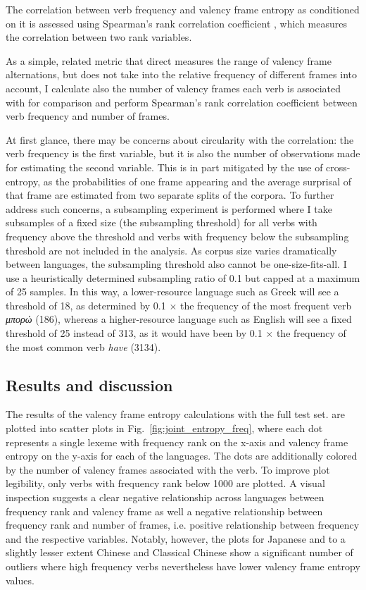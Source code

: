The correlation between verb frequency and valency frame entropy as conditioned on it is assessed using Spearman's rank correlation coefficient \citep{spearman1904}, which measures the correlation between two rank variables. 

As a simple, related metric that direct measures the range of valency frame alternations, but does not take into the relative frequency of different frames into account, I calculate also the number of valency frames each verb is associated with for comparison and perform Spearman's rank correlation coefficient between verb frequency and number of frames.

At first glance, there may be concerns about circularity with the correlation: the verb frequency is the first variable, but it is also the number of observations made for estimating the second variable. This is in part mitigated by the use of cross-entropy, as the probabilities of one frame appearing and the average surprisal of that frame are estimated from two separate splits of the corpora. To further address such concerns, a subsampling experiment is performed where I take subsamples of a fixed size (the subsampling threshold) for all verbs with frequency above the threshold and verbs with frequency below the subsampling threshold are not included in the analysis. As corpus size varies dramatically between languages, the subsampling threshold also cannot be one-size-fits-all. I use a heuristically determined subsampling ratio of 0.1 but capped at a maximum of 25 samples. In this way, a lower-resource language such as Greek will see a threshold of 18, as determined by 0.1 $\times$ the frequency of the most frequent verb \textit{μπορώ} (186), whereas a higher-resource language such as English will see a fixed threshold of 25 instead of 313, as it would have been by 0.1 $\times$ the frequency of the most common verb \textit{have} (3134).

\subsection{Results and discussion}

The results of the valency frame entropy calculations with the full test set. are plotted into scatter plots in Fig.~\ref{fig:joint_entropy_freq}, where each dot represents a single lexeme with frequency rank on the x-axis and valency frame entropy on the y-axis for each of the languages. The dots are additionally colored by the number of valency frames associated with the verb. To improve plot legibility, only verbs with frequency rank below 1000 are plotted. A visual inspection suggests a clear negative relationship across languages between frequency rank and valency frame as well a negative relationship between frequency rank and number of frames, i.e. positive relationship between frequency and the respective variables. Notably, however, the plots for Japanese and to a slightly lesser extent Chinese and Classical Chinese show a significant number of outliers where high frequency verbs nevertheless have lower valency frame entropy values. 

